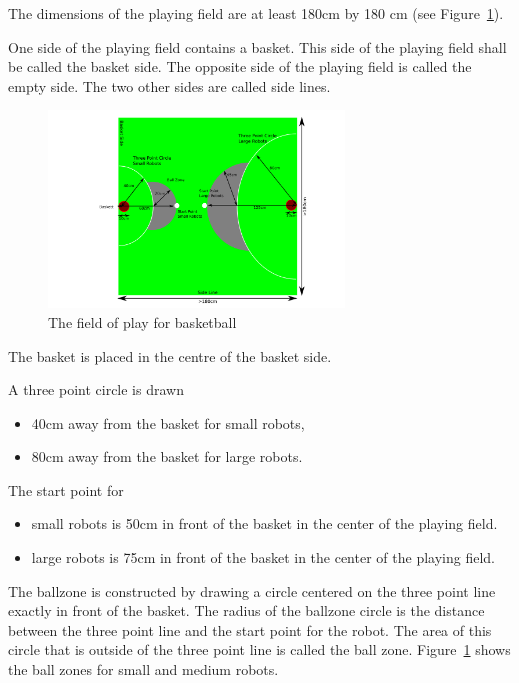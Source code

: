 \documentclass[12pt]{hurocup}
\begin{document}
\begin{lawlist}[BB]

\item The dimensions of the playing field are at least 180cm by
  180 cm (see Figure~\ref{fig:field-basketball}).

\item One side of the playing field contains a basket. This side of the
  playing field shall be called the basket side. The opposite side of
  the playing field is called the empty side. The two other sides are
  called side lines.

  \begin{figure}
    \begin{center}
      \includegraphics[width=0.7\textwidth]{Figures/basketball}
    \end{center}
    \caption{The field of play for basketball}
    \label{fig:field-basketball}
  \end{figure}

\item The basket is placed in the centre of the basket side.

\item A three point circle is drawn 
  \begin{itemize}
    \item 40cm away from the basket for small robots,
    \item 80cm away from the basket for large robots.
  \end{itemize}

\item The start point for
  \begin{itemize}
   \item small robots is 50cm in front of the basket in the center of
    the playing field. 
   \item large robots is 75cm in front of the basket in the center of
    the playing field.
  \end{itemize}

\item The ballzone is constructed by drawing a circle centered on the
  three point line exactly in front of the basket. The radius of the
  ballzone circle is the distance between the three point line and the
  start point for the robot. The area of this circle that is outside
  of the three point line is called the ball
  zone. Figure~\ref{fig:field-basketball} shows the ball zones for
  small and medium robots.

\end{lawlist}
\end{document}
